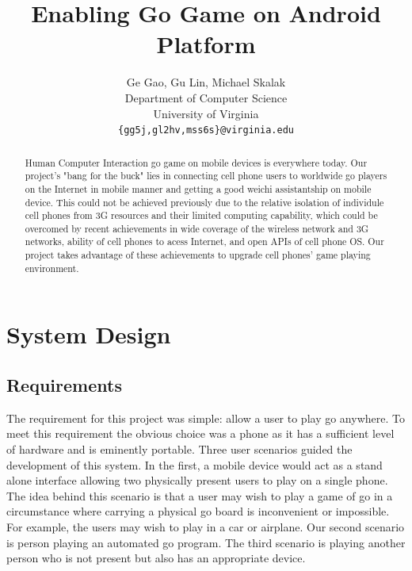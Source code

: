 \documentclass[acmtocl]{acmtrans2m}
\begin{document}
\title{Enabling Go Game on Android Platform} %
\author{
  Ge Gao, Gu Lin, Michael Skalak\\
Department of Computer Science\\
University of Virginia\\
\texttt{\{gg5j,gl2hv,mss6s\}@virginia.edu}\\
}  %
\date{}  %

\maketitle

\begin{abstract}
Human Computer Interaction go game on mobile devices is everywhere today. Our project's "bang for the buck" lies in connecting cell phone users to worldwide go players on the Internet in mobile manner and getting a good weichi assistantship on mobile device. This could not be achieved previously due to the relative isolation of individule cell phones from 3G resources and their limited computing capability, which could be overcomed by recent  achievements in wide coverage of the wireless network and 3G networks, ability of cell phones to acess Internet, and open APIs of cell phone OS. Our project takes advantage of these achievements to upgrade cell phones' game playing environment.
\end{abstract}


\section{System Design}

\subsection{Requirements}

The requirement for this project was simple: allow a user to play go anywhere.  To meet this requirement the obvious choice was a phone as it has a sufficient level of hardware and is eminently portable.  Three user scenarios guided the development of this system.  In the first, a mobile device would act as a stand alone interface allowing two physically present users to play on a single phone.  The idea behind this scenario is that a user may wish to play a game of go in a circumstance where carrying a physical go board is inconvenient or impossible.  For example, the users may wish to play in a car or airplane.  Our second scenario is person playing an automated go program.  The third scenario is playing another person who is not present but also has an appropriate device.  
\end{document}
